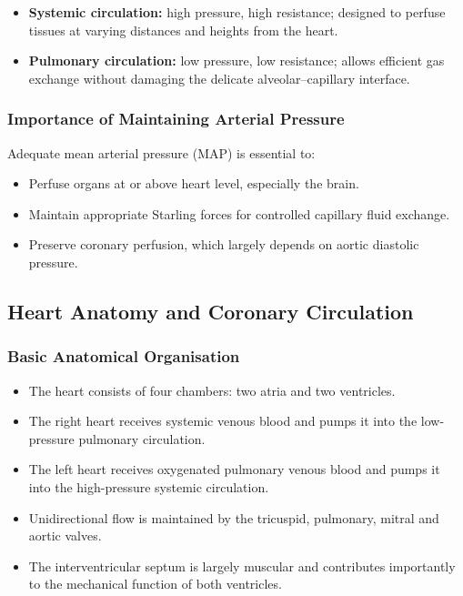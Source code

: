 \documentclass[11pt,a4paper]{article}
\begin{document}
\begin{itemize}
  \item \textbf{Systemic circulation:} high pressure, high resistance; designed to perfuse tissues at varying distances and heights from the heart.
  \item \textbf{Pulmonary circulation:} low pressure, low resistance; allows efficient gas exchange without damaging the delicate alveolar--capillary interface.
\end{itemize}

\subsubsection{Importance of Maintaining Arterial Pressure}

Adequate mean arterial pressure (MAP) is essential to:
\begin{itemize}
  \item Perfuse organs at or above heart level, especially the brain.
  \item Maintain appropriate Starling forces for controlled capillary fluid exchange.
  \item Preserve coronary perfusion, which largely depends on aortic diastolic pressure.
\end{itemize}

\subsection{Heart Anatomy and Coronary Circulation}

\subsubsection{Basic Anatomical Organisation}

\begin{itemize}
  \item The heart consists of four chambers: two atria and two ventricles.
  \item The right heart receives systemic venous blood and pumps it into the low-pressure pulmonary circulation.
  \item The left heart receives oxygenated pulmonary venous blood and pumps it into the high-pressure systemic circulation.
  \item Unidirectional flow is maintained by the tricuspid, pulmonary, mitral and aortic valves.
  \item The interventricular septum is largely muscular and contributes importantly to the mechanical function of both ventricles.
\end{itemize}
\end{document}
